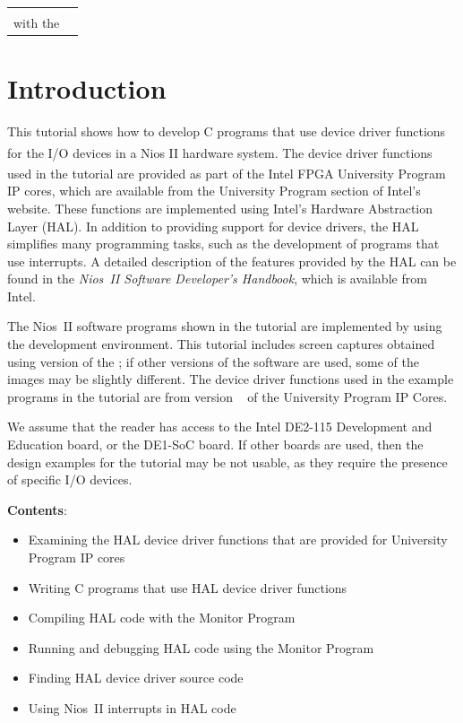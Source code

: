 \documentclass[11pt, twoside, pdftex]{article}
\title{\fontfamily{phv}\selectfont{\doctitle} }
\newcommand{\doctitle}{Using HAL Device Drivers \\ with the \productNameMed{}}
\begin{document}
\begin{table}
    \centering
    \begin{tabular}{p{5cm}p{4cm}}
        \hspace{-3cm}
        &
        \raisebox{1\height}{\parbox[h]{0.5\textwidth}{\Large{}\selectfont{\textsf{\doctitle}}}}
    \end{tabular}
    \label{tab:logo}
\end{table}

\colorbox[rgb]{0,0.384,0.816}{\parbox[h]{\textwidth}{\color{white}\textsf{\textit{\textBar}}}}

\thispagestyle{plain}
 
\section{Introduction}

This tutorial shows how to develop C programs that use device driver functions for the I/O devices in a
Nios\textsuperscript{\textregistered} II hardware system. The device driver functions used in the tutorial are provided as part of the Intel\textsuperscript{\textregistered} FPGA University
Program IP cores, which are available from the University Program section of Intel's website. These 
functions are implemented using Intel's Hardware Abstraction Layer (HAL). In addition to 
providing support for device drivers, the HAL simplifies many programming tasks, such as the development of 
programs that use interrupts. A detailed description of the features provided by the HAL can be found in the
{\it Nios~II Software Developer's Handbook}, which is available from Intel.

The Nios~II software programs shown in the tutorial are implemented by using 
the \productNameMed{} development environment.
This tutorial includes screen captures obtained using version \versnum of the
\productNameMed{}; if other versions of the software are used, some of the
images may be slightly different. The device driver functions used in the example programs in the tutorial are from version \versnum~ of the University Program IP Cores.

We assume that the reader has access to the Intel DE2-115 Development 
and Education board, or the DE1-SoC board. If other boards are used, then the design examples
for the tutorial may be not usable, as they require the presence of specific I/O devices.
 
 
{\bf Contents}:
\begin{itemize}
\item Examining the HAL device driver functions that are provided for University Program IP cores
\item Writing C programs that use HAL device driver functions
\item Compiling HAL code with the Monitor Program
\item Running and debugging HAL code using the Monitor Program
\item Finding HAL device driver source code
\item Using Nios~II interrupts in HAL code
\end{itemize}
\clearpage
\newpage
\end{document}
